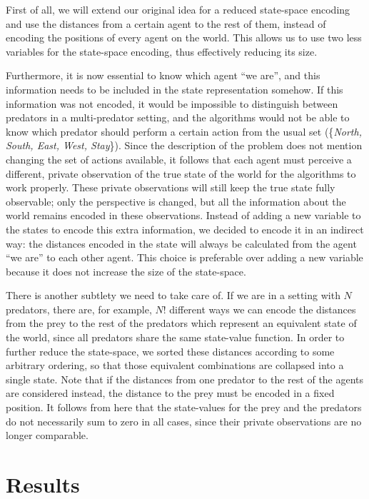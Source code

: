\documentclass[a4paper,12pt]{article}
\begin{document}
First of all, we will extend our original idea for a reduced state-space encoding and use the distances from a certain agent to the rest of them, instead of encoding the positions of every agent on the world. This allows us to use two less variables for the state-space encoding, thus effectively reducing its size. 

Furthermore, it is now essential to know which agent ``we are'', and this information needs to be included in the state representation somehow. If this information was not encoded, it would be impossible to distinguish between predators in a multi-predator setting, and the algorithms would not be able to know which predator should perform a certain action from the usual set (\{\textit{North, South, East, West, Stay}\}). Since the description of the problem does not mention changing the set of actions available, it follows that each agent must perceive a different, private observation of the true state of the world for the algorithms to work properly. These private observations will still keep the true state fully observable; only the perspective is changed, but all the information about the world remains encoded in these observations. Instead of adding a new variable to the states to encode this extra information, we decided to encode it in an indirect way: the distances encoded in the state will always be calculated from the agent ``we are'' to each other agent. This choice is preferable over adding a new variable because it does not increase the size of the state-space.

There is another subtlety we need to take care of. If we are in a setting with $N$ predators, there are, for example, $N!$ different ways we can encode the distances from the prey to the rest of the predators which represent an equivalent state of the world, since all predators share the same state-value function. In order to further reduce the state-space, we sorted these distances according to some arbitrary ordering, so that those equivalent combinations are collapsed into a single state. Note that if the distances from one predator to the rest of the agents are considered instead, the distance to the prey must be encoded in a fixed position. It follows from here that the state-values for the prey and the predators do not necessarily sum to zero in all cases, since their private observations are no longer comparable.

\section{Results}
\end{document}
